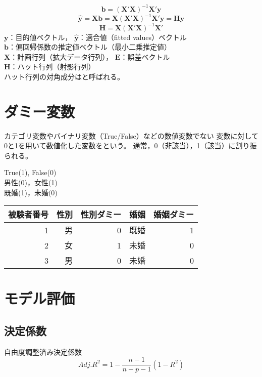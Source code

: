 \MyFrame{\insertsection}
{
  \[\bm{b}=(\bm{X}'\bm{X})^{-1}\bm{X}'\bm{y}\]
  \[\bm{\hat{y}}=\bm{X}\bm{b}=\bm{X}(\bm{X}'\bm{X})^{-1}\bm{X}'\bm{y}=\bm{H}\bm{y}\]
  \[\bm{H}=\bm{X}(\bm{X}'\bm{X})^{-1}\bm{X}'\]
  $\bm{y}$：目的値ベクトル，
  $\bm{\hat{y}}$：適合値（fitted values）ベクトル\\
  $\bm{b}$：偏回帰係数の推定値ベクトル（最小二乗推定値）\\
  $\bm{X}$：計画行列（拡大データ行列），
  $\bm{E}$：誤差ベクトル\\
  $\bm{H}$：ハット行列（射影行列）\\
  {ハット行列の対角成分はと呼ばれる。}
}

\section{ダミー変数}

\MyFrame{\insertsection}
{
  {
    カテゴリ変数やバイナリ変数（True/False）などの数値変数でない
    変数に対して0と1を用いて数値化した変数をという。
    通常，0（非該当），1（該当）に割り振られる。
  }
}

\MyFrame{\insertsection}
{
  {
    True(1), False(0)\\
    男性(0)，女性(1)\\
    既婚(1)，未婚(0)
  }
  \begin{table}[]
    \begin{tabular}{rrrrr}
    被験者番号 & 性別 & 性別ダミー &  婚姻& 婚姻ダミー \\
    \hline
             1 &  男  & 0          &  既婚&  1\\
             2 &  女  & 1          &  未婚&  0\\
             3 &  男  & 0          &  未婚&  0
    \end{tabular}
  \end{table}
}

\section{モデル評価}

\subsection{決定係数}

\MyFrame{\insertsubsection}
{
  {
    自由度調整済み決定係数
    \[Adj. R^2=1-\frac{n-1}{n-p-1}(1-R^2)\]
  }
}

